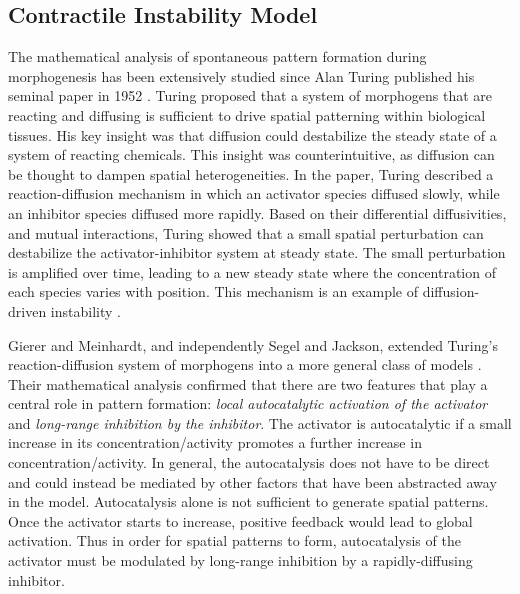 \documentclass{ucetd}
\begin{document}
\subsection{Contractile Instability Model}
The mathematical analysis of spontaneous pattern formation during morphogenesis has been extensively studied since Alan Turing published his seminal paper in 1952 \cite{Turing:1952vn, Kondo:2010bx}.  Turing proposed that a system of morphogens that are reacting and diffusing  is sufficient to drive spatial patterning within biological tissues.  His key insight was that diffusion could destabilize the steady state of a system of reacting chemicals.  This insight was counterintuitive, as diffusion can be thought to dampen spatial heterogeneities.  In the paper, Turing described a reaction-diffusion mechanism in which an activator species diffused slowly, while an inhibitor species diffused more rapidly.  Based on their differential diffusivities, and mutual interactions, Turing showed that a small spatial perturbation can destabilize the activator-inhibitor system at steady state.  The small perturbation is amplified over time, leading to a new steady state where the concentration of each species varies with position.  This mechanism is an example of diffusion-driven instability \cite{Segel:1972wb}.

Gierer and Meinhardt, and independently Segel and Jackson, extended Turing's reaction-diffusion system of morphogens into a more general class of models \cite{Gierer:1972vq,Segel:1972wb}.  Their mathematical analysis confirmed that there are two features that play a central role in pattern formation: \textit{local autocatalytic activation of the activator} and \textit{long-range inhibition by the inhibitor}.  The activator is autocatalytic if a small increase in its concentration/activity promotes a further increase in concentration/activity.  In general, the autocatalysis does not have to be direct and could instead be mediated by other factors that have been abstracted away in the model.  Autocatalysis alone is not sufficient to generate spatial patterns. Once the activator starts to increase, positive feedback would lead to global activation.  Thus in order for spatial patterns to form, autocatalysis of the activator must be modulated by long-range inhibition by a rapidly-diffusing inhibitor.  
\end{document}
